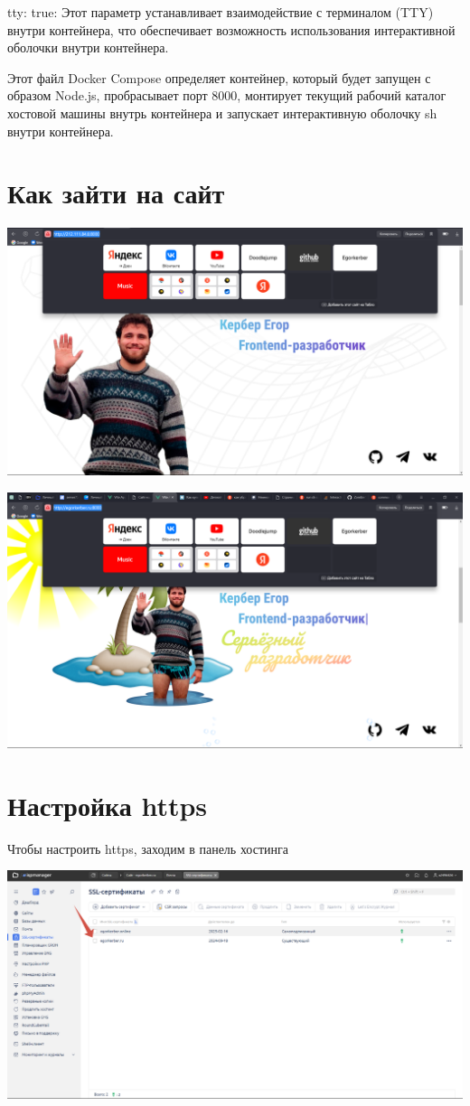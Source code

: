 \documentclass[14pt, a4paper]{extarticle}
\begin{document}
tty: true: Этот параметр устанавливает взаимодействие с терминалом (TTY) внутри контейнера, что обеспечивает возможность использования интерактивной оболочки внутри контейнера.

Этот файл Docker Compose определяет контейнер, который будет запущен с образом Node.js, пробрасывает порт 8000, монтирует текущий рабочий каталог хостовой машины внутрь контейнера и запускает интерактивную оболочку sh внутри контейнера.

\newpage
\section{Как зайти на сайт}

\includegraphics*[width=0.8\linewidth]{img/2024-02-17-22-14-45.png}

\includegraphics*[width=0.8\linewidth]{img/2024-02-17-22-14-58.png}

\newpage
\section{Настройка https}

Чтобы настроить https, заходим в панель хостинга

\includegraphics*[width=0.8\linewidth]{img/2024-02-19-19-11-07.png}
\end{document}
